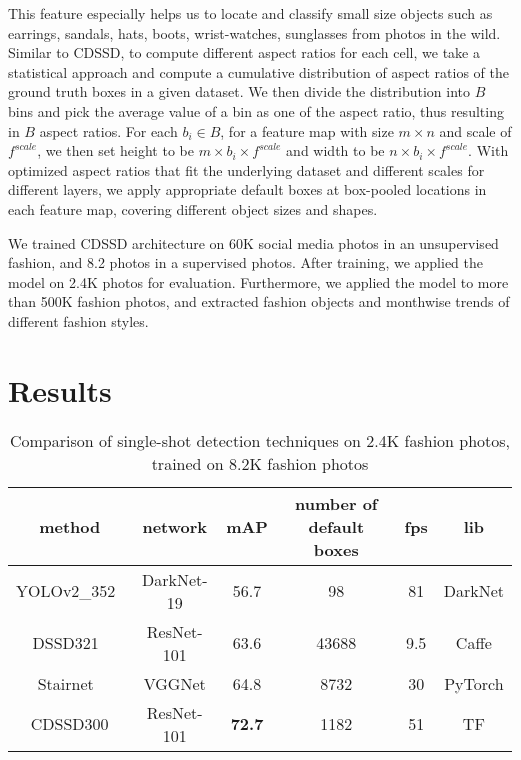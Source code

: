 \documentclass[sigconf]{acmart}
\begin{document}
This feature especially helps us to locate and classify
small size objects such as earrings, sandals, hats, boots,
wrist-watches, sunglasses from photos in the wild.
Similar to CDSSD,
to compute different aspect ratios for each cell, we take a statistical approach
and compute a cumulative distribution of aspect ratios
of the ground truth boxes in a given dataset.
We then divide the distribution into $B$ bins
and pick the average value of a bin as one of the aspect ratio,
thus resulting in $B$ aspect ratios.
For each $b_i \in B$, 
for a feature map with size
$m \times n$ and scale of $f^{scale}$,
we then set height to be
$m \times b_i \times f^{scale}$ and width to be
$n \times b_i \times f^{scale}$.
With optimized aspect ratios that fit the underlying dataset
and different scales for different layers,
we apply appropriate default boxes at box-pooled locations
in each feature map, covering different object sizes and shapes.

We trained CDSSD architecture on 60K social media photos
in an unsupervised fashion, and 8.2 photos in a supervised
photos. After training, we applied the model on 2.4K photos
for evaluation. Furthermore, we applied the model to more than
500K fashion photos, and extracted fashion objects and monthwise
trends of different fashion styles.


\section{Results}
\label{results}

\begin{table*}
  \centering
  \caption{Comparison of single-shot detection techniques on 2.4K fashion photos,
           trained on 8.2K fashion photos}
\begin{tabular}{c | c c c c c}
method & network & mAP & number of default boxes & fps & lib \\
\hline
YOLOv2\_352~\cite{RedmonCVPR16} & DarkNet-19 & 56.7 & 98 & 81 & DarkNet \\
DSSD321~\cite{FuLRTB17} & ResNet-101 & 63.6 & 43688 & 9.5 & Caffe\\
Stairnet~\cite{stairnet17} & VGGNet & 64.8 & 8732 & 30 & PyTorch\\
CDSSD300 & ResNet-101 & \textbf{72.7} & 1182 & 51 & TF\\
\end{tabular}
  \label{tab:fashionphotosmap}
\end{table*}
\end{document}
